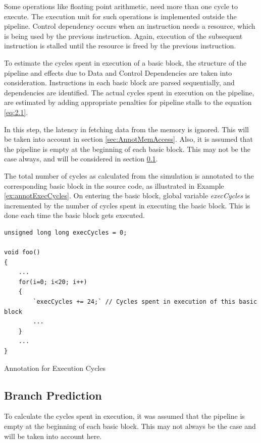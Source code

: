 Some operations like floating point arithmetic, need more than one cycle to execute. The execution unit for such operations is implemented outside the pipeline. Control dependency occurs when an instruction needs a resource, which is being used by the previous instruction. Again, execution of the subsequent instruction is stalled until the resource is freed by the previous instruction.

To estimate the cycles spent in execution of a basic block, the structure of the pipeline and effects due to Data and Control Dependencies are taken into consideration. Instructions in each basic block are parsed sequentially, and dependencies are identified. The actual cycles spent in execution on the pipeline, are estimated by adding appropriate penalties for pipeline stalls to the equation \ref{eq:2.1}.

In this step, the latency in fetching data from the memory is ignored. This will be taken into account in section \ref{sec:AnnotMemAccess}. Also, it is assumed that the pipeline is empty at the beginning of each basic block. This may not be the case always, and will be considered in section \ref{subsec:BranchPred}.

The total number of cycles as calculated from the simulation is annotated to the corresponding basic block in the source code, as illustrated in Example \ref{ex:annotExecCycles}. On entering the basic block, global variable \emph{execCycles} is incremented by the number of cycles spent in executing the basic block. This is done each time the basic block gets executed.

\begin{Example}[h]
\begin{lstlisting}
unsigned long long execCycles = 0;

void foo()
{
    ...
    for(i=0; i<20; i++)
    {
        `execCycles += 24;` // Cycles spent in execution of this basic block
        ...
    }
    ...
}
\end{lstlisting}
\caption{Annotation for Execution Cycles}
\label{ex:annotExecCycles}
\end{Example}

\subsection{Branch Prediction}
\label{subsec:BranchPred}
To calculate the cycles spent in execution, it was assumed that the pipeline is empty at the beginning of each basic block. This may not always be the case and will be taken into account here.

